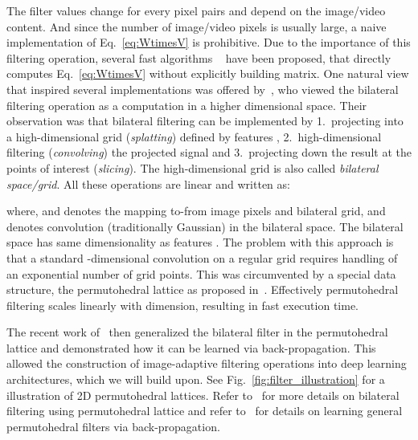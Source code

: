 \documentclass[10pt,twocolumn,letterpaper]{article}
\begin{document}
The filter values  change for every pixel pairs  and depend on the image/video content.
And since the number of image/video pixels is usually large,
a naive implementation of
Eq.~\ref{eq:WtimesV} is prohibitive.
Due to the importance of this filtering operation, several fast algorithms
~\cite{adams2010fast,adams2009gaussian,paris2006fast,gastal2011domain} have been proposed,
that directly computes Eq.~\ref{eq:WtimesV} without explicitly building  matrix.
One natural view that inspired several implementations was offered by~\cite{paris2006fast}, who viewed the bilateral filtering operation as a computation in a higher dimensional space.
Their observation was that bilateral filtering can be implemented by 1.~projecting  into a high-dimensional grid (\emph{splatting}) defined by features , 2.~high-dimensional filtering (\emph{convolving}) the projected signal and 3.~projecting down the result at the points of interest (\emph{slicing}). The high-dimensional grid is also called \emph{bilateral space/grid}.
All these operations are linear and written as:

\vspace{-0.3cm}


where,  and  denotes the mapping to-from image pixels and bilateral grid, and  denotes
convolution (traditionally Gaussian) in the bilateral space. The bilateral space has same dimensionality  as
features . The problem with this approach is that a standard -dimensional convolution on a
regular grid requires handling of an exponential number of grid points.
This was circumvented by a special data structure, the permutohedral lattice as proposed in~\cite{adams2010fast}.
Effectively permutohedral filtering scales linearly with dimension, resulting in fast execution
time.

The recent work of~\cite{kiefel2014permutohedral,jampani_2016_cvpr} then generalized the bilateral filter in the
permutohedral lattice and demonstrated how it can be learned via back-propagation.
This allowed the construction of image-adaptive filtering operations into deep learning architectures, which we
will build upon. See Fig.~\ref{fig:filter_illustration} for a illustration of
2D permutohedral lattices. Refer to~\cite{adams2010fast} for more details on bilateral filtering
using permutohedral lattice and refer to~\cite{jampani_2016_cvpr} for details on
learning general permutohedral filters via back-propagation.
\end{document}

